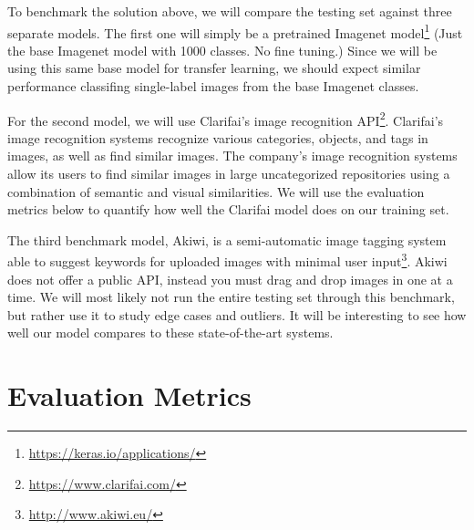 \documentclass[10pt, a4paper, twocolumn]{article} %
\begin{document}

To benchmark the solution above, we will compare the testing set against three separate models.  The first one will simply be a pretrained Imagenet model\footnote{\url{https://keras.io/applications/}} (Just the base Imagenet model with 1000 classes. No fine tuning.) Since we will be using this same base model for transfer learning, we should expect similar performance classifing single-label images from the base Imagenet classes.  

For the second model, we will use Clarifai's image recognition API\footnote{\url{https://www.clarifai.com/}}.  Clarifai’s image recognition systems recognize various categories, objects, and tags in images, as well as find similar images. The company’s image recognition systems allow its users to find similar images in large uncategorized repositories using a combination of semantic and visual similarities.  We will use the evaluation metrics below to quantify how well the Clarifai model does on our training set.

The third benchmark model, Akiwi, is a semi-automatic image tagging system able to suggest keywords for uploaded images with minimal user input\footnote{\url{http://www.akiwi.eu/}}.  Akiwi does not offer a public API, instead you must drag and drop images in one at a time. We will most likely not run the entire testing set through this benchmark, but rather use it to study edge cases and outliers. It will be interesting to see how well our model compares to these state-of-the-art systems.


\section{Evaluation Metrics} %
\end{document}

